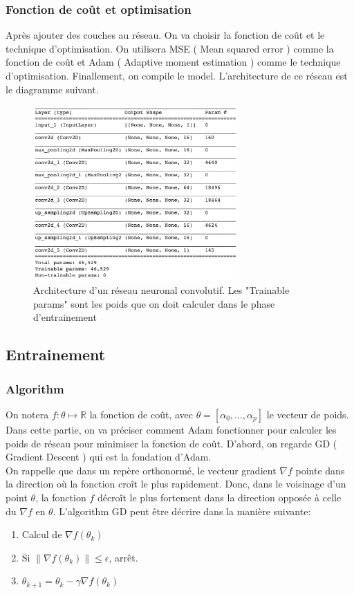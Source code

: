 \documentclass[12pt,a4paper]{article}
\begin{document}
\subsubsection{Fonction de coût et optimisation}
Après ajouter des couches au réseau. On va choisir la fonction de coût
et le technique d'optimisation. On utilisera MSE ( Mean squared error )
comme la fonction de coût et Adam ( Adaptive moment estimation )
comme le technique d'optimisation. Finallement, on compile le model. L'architecture
de ce réseau est le diagramme suivant.
\begin{figure}
  \includegraphics[width=0.7\textwidth]{architecture.png}
  \caption[Architecture d'un réseau neuronal convolutif]{Architecture d'un réseau neuronal convolutif.
  Les "Trainable params" sont les poids que on doit calculer dans le phase d'entrainement}
  \label{fig:6}
\end{figure}

\subsection{Entrainement}
\subsubsection{Algorithm}
On notera $f:\theta \mapsto \mathbb{R}$ la fonction de coût, avec $\theta  = [\alpha_{0}, \dots, \alpha_{p}]$ le vecteur de poids. Dans cette partie, on va préciser comment Adam fonctionner
pour calculer les poids de réseau pour minimiser la fonction de coût. D'abord, on regarde GD ( Gradient Descent )
qui est la fondation d'Adam.\\

On rappelle que dans un repère orthonormé, le vecteur gradient $\nabla f$ pointe dans la direction où la fonction croît le plus rapidement.
Donc, dans le voisinage d'un point $\theta$, la fonction $f$ décroît le plus fortement
dans la direction opposée à celle du $\nabla f$ en $\theta$. L'algorithm GD peut être décrire dans la manière suivante: \cite{gradient-descent-wiki}
\begin{enumerate}
  \item Calcul de $\nabla f(\theta_{k})$
  \item Si $\| \nabla f(\theta_{k})\| \leqslant \epsilon$, arrêt.
  \item $\theta_{k+1} = \theta_{k} - \gamma\nabla f(\theta_{k})$
\end{enumerate}
\end{document}
